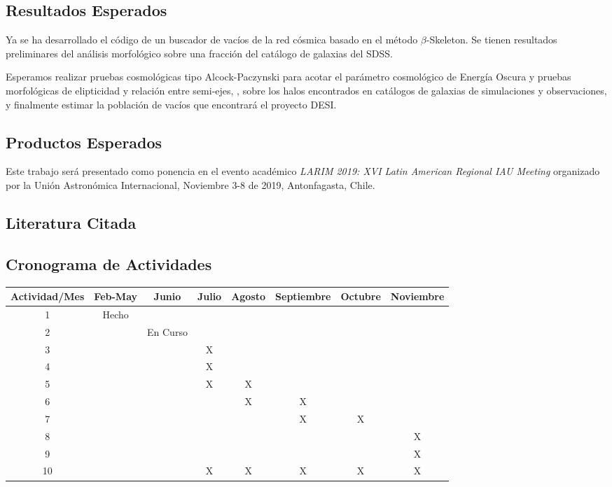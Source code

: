\documentclass[manuscript]{aastex62}
\begin{document}
\subsection{Resultados Esperados}

Ya se ha desarrollado el código de un buscador de vacíos de la red cósmica basado en el
método $\beta$-Skeleton. Se tienen resultados preliminares del análisis morfológico
sobre una fracción del catálogo de galaxias del SDSS.

Esperamos realizar pruebas cosmológicas tipo Alcock-Paczynski \citet{AlcockPaczynski1979}
para acotar el parámetro cosmológico de Energía Oscura
y pruebas morfológicas de elipticidad y relación entre semi-ejes,
\citep{Bos2012,Lavaux-Wandelt2009,Park-Lee2007}, sobre los halos encontrados en
catálogos de galaxias de simulaciones y observaciones, y finalmente
estimar la población de vacíos que encontrará el proyecto DESI.

\subsection{Productos Esperados}
Este trabajo será presentado como ponencia en el evento académico \textit{LARIM 2019: XVI
  Latin American Regional IAU Meeting} organizado por la Unión Astronómica
Internacional, Noviembre 3-8 de 2019, Antonfagasta, Chile.

\subsection{Literatura Citada}


\subsection{Cronograma de Actividades}
\begin{table}[h]
  \centering
  \begin{tabular}{|c|c|c|c|c|c|c|c|} \hline\hline
    Actividad/Mes & Feb-May & Junio & Julio & Agosto & Septiembre & Octubre & Noviembre \\ \hline
    1 & Hecho &   &   &   &   &   &    \\
    2 &   & En Curso &   &   &   &   &    \\
    3 &   &   & X &   &   &   &    \\
    4 &   &   & X &   &   &   &    \\
    5 &   &   & X & X &   &   &    \\
    6 &   &   &   & X & X &   &    \\
    7 &   &   &   &   & X & X &    \\
    8 &   &   &   &   &   &   & X \\
    9 &   &   &   &   &   &   & X \\
   10 &   &   & X & X & X & X & X \\    \hline
\end{tabular}
\end{table}
\end{document}
